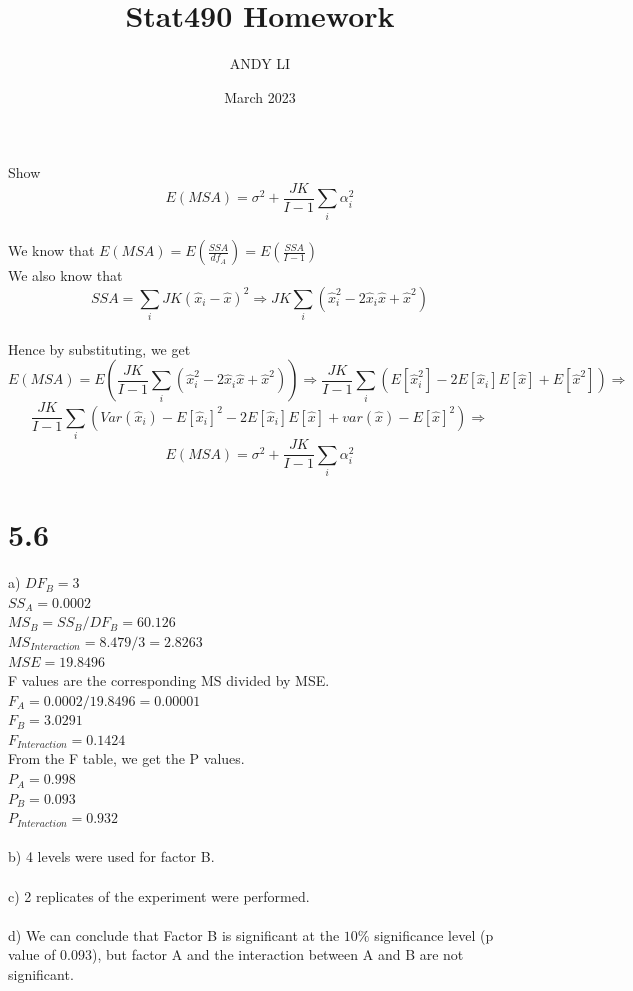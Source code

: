 \documentclass{article}
\title{Stat490 Homework}
\author{ANDY LI}
\date{March 2023}
\begin{document}
\maketitle
Show $$E(MSA) = \sigma^2 + \frac{JK}{I-1} \sum_i \alpha_i^2$$
\\We know that $E(MSA) = E(\frac{SSA}{df_A}) = E(\frac{SSA}{I - 1})$
\\We also know that $$SSA = \sum_i JK(\hat{x}_i - \hat{x})^2 \Rightarrow JK\sum_i (\hat{x}_i^2 - 2\hat{x}_i\hat{x} + \hat{x}^2)$$
\\Hence by substituting, we get $$E(MSA) = E(\frac{JK}{I -1} \sum_i (\hat{x}_i^2 - 2\hat{x}_i\hat{x} + \hat{x}^2)) \Rightarrow \frac{JK}{I - 1} \sum_i (E[\hat{x}_i^2] - 2E[\hat{x}_i]E[\hat{x}] + E[\hat{x}^2]) \Rightarrow$$
$$\frac{JK}{I - 1} \sum_i (Var(\hat{x}_i) - E[\hat{x}_i]^2 - 2E[\hat{x}_i]E[\hat{x}] + var(\hat{x}) - E[\hat{x}]^2) \Rightarrow$$
$$E(MSA) = \sigma^2 + \frac{JK}{I - 1} \sum_i \alpha_i^2$$

\section*{5.6}
a) $DF_B = 3$
\\$SS_A = 0.0002$
\\$MS_B = SS_B / DF_B = 60.126$
\\$MS_{Interaction} = 8.479/3 = 2.8263$
\\$MSE = 19.8496$
\\F values are the corresponding MS divided by MSE.
\\$F_A = 0.0002 / 19.8496 = 0.00001$
\\$F_B = 3.0291$
\\$F_{Interaction} = 0.1424$
\\From the F table, we get the P values.
\\$P_A = 0.998$
\\$P_B = 0.093$
\\$P_{Interaction} = 0.932$
\\
\\b) 4 levels were used for factor B.
\\
\\c) 2 replicates of the experiment were performed.
\\
\\d) We can conclude that Factor B is significant at the $10\%$ significance level (p value of 0.093), but factor A and the interaction between A and B are not significant.
\end{document}
